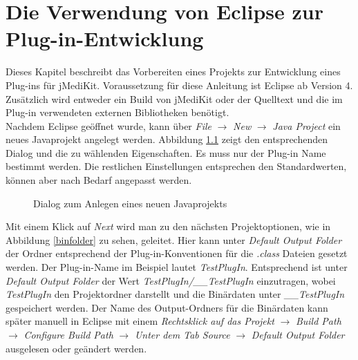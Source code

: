 \chapter{Die Verwendung von Eclipse zur Plug-in-Entwicklung}

Dieses Kapitel beschreibt das Vorbereiten eines Projekts zur Entwicklung eines Plug-ins für jMediKit. Voraussetzung für diese Anleitung ist Eclipse ab Version 4. Zusätzlich wird entweder ein Build von jMediKit oder der Quelltext und die im Plug-in verwendeten externen Bibliotheken benötigt.\\
Nachdem Eclipse geöffnet wurde, kann über \textit{File} $\rightarrow$ \textit{New} $\rightarrow$ \textit{Java Project} ein neues Javaprojekt angelegt werden. Abbildung \ref{newproject} zeigt den entsprechenden Dialog und die zu wählenden Eigenschaften. Es muss nur der Plug-in Name bestimmt werden. Die restlichen Einstellungen entsprechen den Standardwerten, können aber nach Bedarf angepasst werden.

\begin{figure}[H]
  \vspace{0.5cm}
  \centering
  \caption{Dialog zum Anlegen eines neuen Javaprojekts}
  \label{newproject}
  \vspace{0.5cm}
\end{figure}

Mit einem Klick auf \textit{Next} wird man zu den nächsten Projektoptionen, wie in Abbildung \ref{binfolder} zu sehen, geleitet. Hier kann unter \textit{Default Output Folder} der Ordner entsprechend der Plug-in-Konventionen für die \textit{.class} Dateien gesetzt werden. Der Plug-in-Name im Beispiel lautet \textit{TestPlugIn}. Entsprechend ist unter \textit{Default Output Folder} der Wert \mbox{\textit{TestPlugIn/\_\_TestPlugIn}} einzutragen, wobei \textit{TestPlugIn} den Projektordner darstellt und die Binärdaten unter \textit{\_\_TestPlugIn} gespeichert werden. Der Name des Output-Ordners für die Binärdaten kann später manuell in Eclipse mit einem \textit{Rechtsklick auf das Projekt} $\rightarrow$ \textit{Build Path} $\rightarrow$ \textit{Configure Build Path} $\rightarrow$ \textit{Unter dem Tab Source} $\rightarrow$ \textit{Default Output Folder} ausgelesen oder geändert werden.


